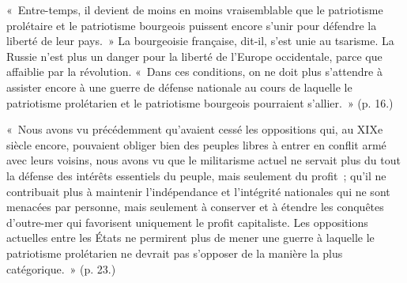 \documentclass[french,twoside]{book} %
\newenvironment{quoteblock}%
  {\begin{quoting}}
  {\end{quoting}}
\newenvironment{quotebar}{%
    \def\FrameCommand{{\color{rubric!10!}\vrule width 0.5em} \hspace{0.9em}}%
    \def\OuterFrameSep{\itemsep} %
    \MakeFramed {\advance\hsize-\width \FrameRestore}
  }%
  {%
    \endMakeFramed
  }
\renewenvironment{quoteblock}%
  {%
    \savenotes
    \setstretch{0.9}
    \normalfont
    \begin{quotebar}
  }
  {%
    \end{quotebar}
    \spewnotes
  }
\begin{document}
\begin{quoteblock}
 « Entre-temps, il devient de moins en moins vraisemblable que le patriotisme prolétaire et le patriotisme bourgeois puissent encore s’unir pour défendre la liberté de leur pays. » La bourgeoisie française, dit-il, s’est unie au tsarisme. La Russie n’est plus un danger pour la liberté de l’Europe occidentale, parce que affaiblie par la révolution. « Dans ces conditions, on ne doit plus s’attendre à assister encore à une guerre de défense nationale au cours de laquelle le patriotisme prolétarien et le patriotisme bourgeois pourraient s’allier. » (p. 16.)\par
 « Nous avons vu précédemment qu’avaient cessé les oppositions qui, au XIXe siècle encore, pouvaient obliger bien des peuples libres à entrer en conflit armé avec leurs voisins, nous avons vu que le militarisme actuel ne servait plus du tout la défense des intérêts essentiels du peuple, mais seulement du profit ; qu’il ne contribuait plus à maintenir l’indépendance et l’intégrité nationales qui ne sont menacées par personne, mais seulement à conserver et à étendre les conquêtes d’outre-mer qui favorisent uniquement le profit capitaliste. Les oppositions actuelles entre les États ne permirent plus de mener une guerre à laquelle le patriotisme prolétarien ne devrait pas s’opposer de la manière la plus catégorique. » (p. 23.)
\end{quoteblock}
\end{document}
